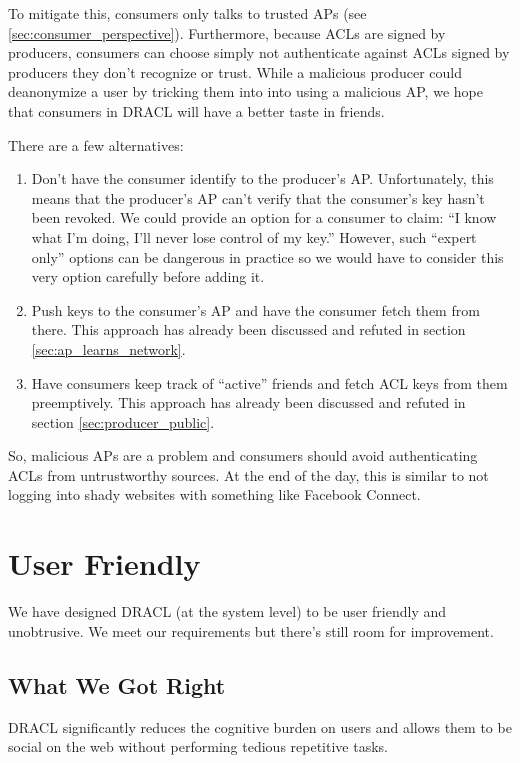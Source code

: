 \documentclass[pdftex,12pt,a4papaer,twoside,notitlepage]{report}
\begin{document}
To mitigate this, consumers only talks to trusted APs (see
\cref{sec:consumer_perspective}). Furthermore, because ACLs are signed by
producers, consumers can choose simply not authenticate against ACLs signed by
producers they don't recognize or trust. While a malicious producer could
deanonymize a user by tricking them into into using a malicious AP, we hope that
consumers in DRACL will have a better taste in friends.

There are a few alternatives:

\begin{enumerate}
\item Don't have the consumer identify to the producer's AP. Unfortunately, this
  means that the producer's AP can't verify that the consumer's key hasn't been
  revoked. We could provide an option for a consumer to claim: ``I know what I'm
  doing, I'll never lose control of my key.'' However, such ``expert only''
  options can be dangerous in practice so we would have to consider this very
  option carefully before adding it.
\item Push keys to the consumer's AP and have the consumer fetch them from
  there. This approach has already been discussed and refuted in section
  \cref{sec:ap_learns_network}.
\item Have consumers keep track of ``active'' friends and fetch ACL keys from
  them preemptively. This approach has already been discussed and refuted in
  section \cref{sec:producer_public}.
\end{enumerate}

So, malicious APs are a problem and consumers should avoid authenticating ACLs
from untrustworthy sources. At the end of the day, this is similar to not
logging into shady websites with something like Facebook Connect.


\section{User Friendly}
\label{sec:user_friendly}

We have designed DRACL (at the system level) to be user friendly and
unobtrusive. We meet our requirements but there's still room for improvement.

\subsection{What We Got Right}

DRACL significantly reduces the cognitive burden on users and allows them to be
social on the web without performing tedious repetitive tasks.
\end{document}
